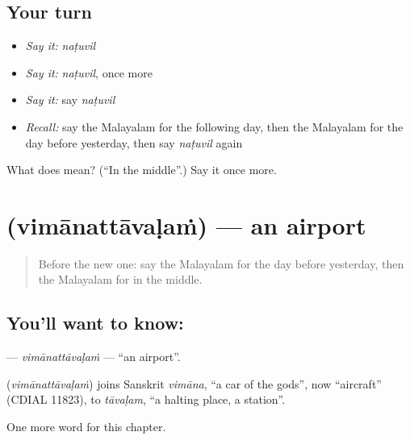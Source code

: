 \subsection*{Your turn}
\begin{itemize}
\raggedright
  \item \emph{Say it:} \emph{naṭuvil}
  \item \emph{Say it:} \emph{naṭuvil}, once more
  \item \emph{Say it:} say \emph{naṭuvil}
  \item \emph{Recall:} say the Malayalam for the following day, then the Malayalam for the day before yesterday, then say \emph{naṭuvil} again
\end{itemize}

\begin{tcolorbox}[breakable,colback=teal!4,colframe=teal!35!black,title={Before you move on}]
What does  mean? (\textquotedblleft{}In the middle\textquotedblright{}.) Say it once more.
\end{tcolorbox}
\section[\texorpdfstring{\ml{വിമാനത്താവളം} (vimānattāvaḷaṁ)}{വിമാനത്താവളം (vimānattāvaḷaṁ)}]{ (vimānattāvaḷaṁ) — an airport}

\label{lesson:ML-C238-vimanattavalam}



\begin{quote}
Before the new one: say the Malayalam for the day before yesterday, then the Malayalam for in the middle.
\end{quote}

\subsection*{You'll want to know: }
\textbf{} — \emph{vimānattāvaḷaṁ} — \textquotedblleft{}an airport\textquotedblright{}.

\begin{cousinweb}
\textbf{} (\emph{vimānattāvaḷaṁ}) joins Sanskrit \emph{vimāna}, \textquotedblleft{}a car of the gods\textquotedblright{}, now \textquotedblleft{}aircraft\textquotedblright{} (CDIAL 11823), to \emph{tāvaḷam}, \textquotedblleft{}a halting place, a station\textquotedblright{}.
\end{cousinweb}

\begin{grammarlens}[title={What you've built}]
One more word for this chapter.
\end{grammarlens}

